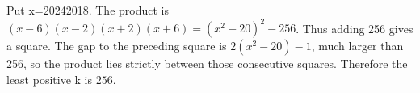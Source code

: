 Put x=20242018. The product is $(x-6)(x-2)(x+2)(x+6)=(x^2-20)^2-256$. Thus adding 256 gives a square. The gap to the preceding square is $2(x^2-20)-1$, much larger than 256, so the product lies strictly between those consecutive squares. Therefore the least positive k is $\boxed{256}$.
